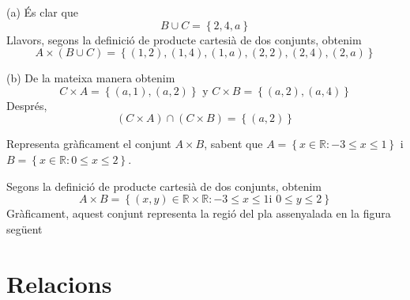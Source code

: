 \begin{solucio}
(a) \'{E}s clar que%
\begin{equation*}
B\cup C=\left\{ 2,4,a\right\}
\end{equation*}%
Llavors, segons la definici\'{o} de producte cartesi\`{a} de dos conjunts,
obtenim%
\begin{equation*}
A\times (B\cup C)=\left\{ (1,2),(1,4),(1,a),(2,2),(2,4),(2,a)\right\}
\end{equation*}

(b) De la mateixa manera obtenim%
\begin{equation*}
C\times A=\left\{ (a,1),(a,2)\right\} \text{ \ \ \ y \ \ \ }C\times
B=\left\{ (a,2),(a,4)\right\}
\end{equation*}%
Despr\'{e}s,%
\begin{equation*}
(C\times A)\cap (C\times B)=\left\{ (a,2)\right\}
\end{equation*}
\end{solucio}

\begin{exer}
Representa gr\`{a}ficament el conjunt $A\times B$, sabent que $A=\left\{
x\in \mathbb{R}:-3\leq x\leq 1\right\} $ i $B=\left\{ x\in \mathbb{R}:0\leq
x\leq 2\right\} $.
\end{exer}

\begin{solucio}
Segons la definici\'{o} de producte cartesi\`{a} de dos conjunts, obtenim%
\begin{equation*}
A\times B=\left\{ (x,y)\in \mathbb{R}\times \mathbb{R}:-3\leq x\leq 1\text{
\ i \ }0\leq y\leq 2\right\}
\end{equation*}%
Gr\`{a}ficament, aquest conjunt representa la regi\'{o} del pla assenyalada
en la figura seg\"{u}ent
\end{solucio}

\section{Relacions}

